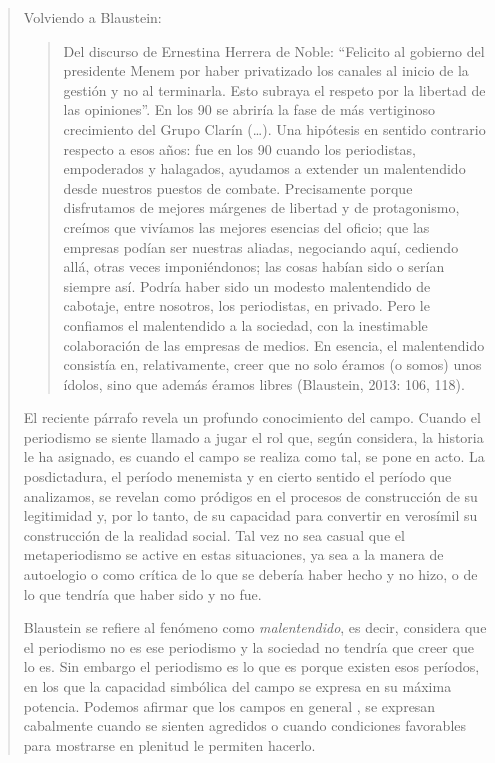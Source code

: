 \begin{quote}
Volviendo a Blaustein:

\begin{quote}
	Del discurso de Ernestina Herrera de Noble: \enquote{Felicito al gobierno del presidente Menem por haber privatizado los canales al inicio de la gestión y no al terminarla. Esto subraya el respeto por la libertad de las opiniones}. En los 90 se abriría la fase de más vertiginoso crecimiento del Grupo Clarín (\dots). Una hipótesis en sentido contrario respecto a esos años: fue en los 90 cuando los periodistas, empoderados y halagados, ayudamos a extender un malentendido desde nuestros puestos de combate. Precisamente porque disfrutamos de mejores márgenes de libertad y de protagonismo, creímos que vivíamos las mejores esencias del oficio; que las empresas podían ser nuestras aliadas, negociando aquí, cediendo allá, otras veces imponiéndonos; las cosas habían sido o serían siempre así. Podría haber sido un modesto malentendido de cabotaje, entre nosotros, los periodistas, en privado. Pero le confiamos el malentendido a la sociedad, con la inestimable colaboración de las empresas de medios. En esencia, el malentendido consistía en, relativamente, creer que no solo éramos (o somos) unos ídolos, sino que además éramos libres (Blaustein, 2013: 106, 118).
\end{quote}


El reciente párrafo revela un profundo conocimiento del campo. Cuando el periodismo se siente llamado a jugar el rol que, según considera, la historia le ha asignado, es cuando el campo se realiza como tal, se pone en acto. La posdictadura, el período menemista y en cierto sentido el período que analizamos, se revelan como pródigos en el procesos de construcción de su legitimidad y, por lo tanto, de su capacidad para convertir en verosímil su construcción de la realidad social. Tal vez no sea casual que el metaperiodismo se active en estas situaciones, ya sea a la manera de autoelogio o como crítica de lo que se debería haber hecho y no hizo, o de lo que tendría que haber sido y no fue.

Blaustein se refiere al fenómeno como \emph{malentendido}, es decir, considera que el periodismo no es ese periodismo y la sociedad no tendría que creer que lo es. Sin embargo el periodismo es lo que es porque existen esos períodos, en los que la capacidad simbólica del campo se expresa en su máxima potencia. Podemos afirmar que los campos en general , se expresan cabalmente cuando se sienten agredidos o cuando condiciones favorables para mostrarse en plenitud le permiten hacerlo.


\end{quote}
